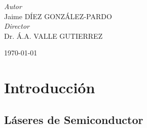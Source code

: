 \documentclass[a4paper, 11pt, oneside]{book}
\begin{document}
\begin{titlepage}
			
				\begin{flushright}
					\large
					\textit{Autor}\\
					Jaime \textsc{DÍEZ GONZÁLEZ-PARDO} \\ %
					\large
					\textit{Director}\\
					Dr. Á.A. \textsc{VALLE GUTIERREZ} %
				\end{flushright}
			
			
				\vfill\vfill\vfill %
				
				{\large\today} %
				
			
				\vfill %
		
		\end{titlepage}


		\tableofcontents

		\listoffigures


			\chapter{Introducción} %
				\label{Intr}


				\section{Láseres de Semiconductor}
					\label{Intr:LsrSmcdtr}
					
\end{document}
